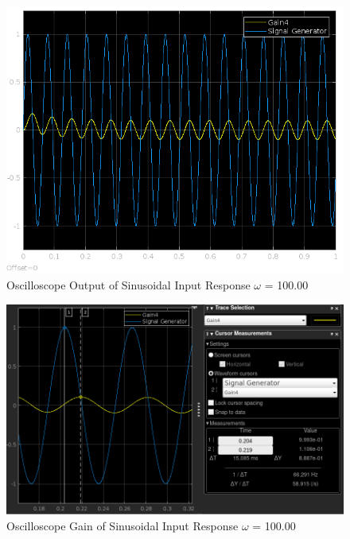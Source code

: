 \documentclass[12pt]{article}
\begin{document}
			\begin{figure}[H]
				\centering
				\includegraphics[width=1\linewidth]{"Code/Fig/sine_input_output_w_100.png"} 
				\caption{Oscilloscope Output of Sinusoidal Input Response $\omega$ = 100.00}
				\label{fig:slx_sine_input_output_w_100}
			\end{figure}
			\begin{figure}[H]
				\centering
				\includegraphics[width=1\linewidth]{"Code/Fig/w_100_mag.png"} 
				\caption{Oscilloscope Gain of Sinusoidal Input Response $\omega$ = 100.00}
				\label{fig:slx_sine_input_output_w_100_mag}
			\end{figure}
\end{document}
